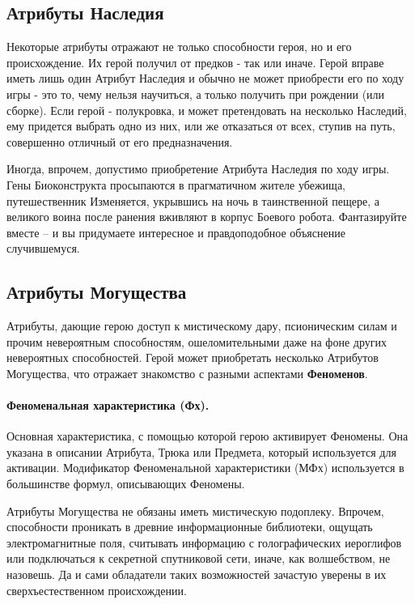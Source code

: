\subsection{Атрибуты Наследия}
Некоторые атрибуты отражают не только способности героя, но и его происхождение. Их герой получил от предков - так или иначе. Герой вправе иметь лишь один Атрибут Наследия и обычно не может приобрести его по ходу игры - это то, чему нельзя научиться, а только получить при рождении (или сборке). Если герой - полукровка, и может претендовать на несколько Наследий, ему придется выбрать одно из них, или же отказаться от всех, ступив на путь, совершенно отличный от его предназначения.
\begin{tcolorbox}
	Иногда, впрочем, допустимо приобретение Атрибута Наследия по ходу игры. Гены Биоконструкта просыпаются в прагматичном жителе убежища, путешественник Изменяется, укрывшись на ночь в таинственной пещере, а великого воина после ранения вживляют в корпус Боевого робота. Фантазируйте вместе – и вы придумаете интересное и правдоподобное объяснение случившемуся.
\end{tcolorbox}

\subsection{Атрибуты Могущества}
Атрибуты, дающие герою доступ к мистическому дару, псионическим силам и прочим невероятным способностям, ошеломительными даже на фоне других невероятных способностей. Герой может приобретать несколько Атрибутов Могущества, что отражает знакомство с разными аспектами \textbf{Феноменов}.
\paragraph{Феноменальная характеристика (Фх).} Основная характеристика, с помощью которой герою активирует Феномены. Она указана в описании Атрибута, Трюка или Предмета, который используется для активации. Модификатор Феноменальной характеристики (МФх) используется в большинстве формул, описывающих Феномены. 
\begin{tcolorbox}
    Атрибуты Могущества не обязаны иметь мистическую подоплеку. Впрочем, способности проникать в древние информационные библиотеки, ощущать электромагнитные поля, считывать информацию с голографических иероглифов или подключаться к секретной спутниковой сети, иначе, как волшебством, не назовешь. Да и сами обладатели таких возможностей зачастую уверены в их сверхъестественном происхождении.
\end{tcolorbox}

